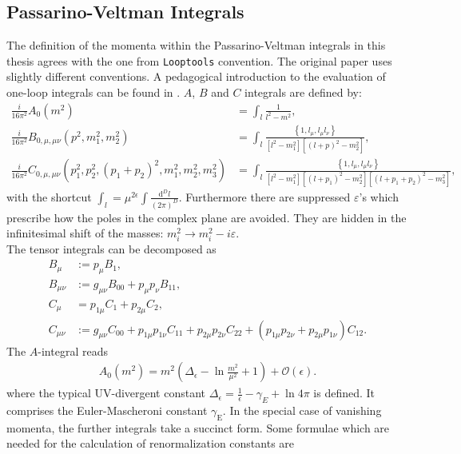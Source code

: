\subsection{Passarino-Veltman Integrals}\label{sec:Passarino}
The definition of the momenta within the Passarino-Veltman integrals in this thesis agrees with the one from \texttt{Looptools} \cite{Hahn:1998} convention. The original paper \cite{Passarino:1978jh} uses slightly different conventions. A pedagogical introduction to the evaluation of one-loop integrals can be found in \cite{Ellis:2011cr}.  $A$, $B$ and $C$ integrals are defined by:
\begin{align}
\frac{i}{16\pi^2} A_0(m^2) &= \int_l \frac{1}{l^2-m^2},\nonumber\\
\frac{i}{16\pi^2} B_{0,\mu,\mu\nu}(p^2,m_1^2,m_2^2) &= \int_l \frac{\left\{1,l_\mu,l_\mu l_\nu \right\}}{[l^2-m_1^2][(l+p)^2-m_2^2]},\\
\frac{i}{16\pi^2} C_{0,\mu,\mu\nu}(p_1^2,p_2^2,(p_1+p_2)^2,m_1^2,m_2^2,m_3^2) &= \int_l \frac{\left\{1,l_\mu,l_\mu l_\nu \right\}}{[l^2-m_1^2][(l+p_1)^2-m_2^2][(l+p_1+p_2)^2-m_3^2]},\nonumber\label{eq:LoopInt}
\end{align}
with the shortcut $\int_l = \mu^{2\epsilon}\int\frac{\mathrm{d}^D l}{(2\pi)^D}$. Furthermore there are suppressed $\varepsilon$'s which prescribe how the poles in the complex plane are avoided. They are hidden in the infinitesimal shift of the masses: $m_i^2 \to m_i^2 - i \varepsilon$.\\
The tensor integrals can be decomposed as
\begin{align}
B_\mu &:= p_\mu B_1,\nonumber\\
B_{\mu\nu} &:= g_{\mu\nu}B_{00} + p_\mu p_\nu B_{11},\nonumber\\
C_\mu &= p_{1\mu}C_1 + p_{2\mu}C_2,\\
C_{\mu\nu} &:= g_{\mu\nu}C_{00} + p_{1\mu}p_{1\nu}C_{11} + p_{2\mu}p_{2\nu}C_{22} + (p_{1\mu}p_{2\nu} + p_{2\mu}p_{1\nu})C_{12}.\nonumber
\end{align}
The $A$-integral reads
\begin{align}
A_0(m^2) = m^2\left( \Delta_\epsilon -\ln \frac{m^2}{\mu^2} + 1 \right) + \mathcal{O}(\epsilon).
\end{align}
where the typical UV-divergent constant $\Delta_\epsilon = \frac{1}{\epsilon} - \gamma_E+\ln 4\pi$ is defined. It comprises the Euler-Mascheroni constant $\gamma_{\mathrm{E}}$. In the special case of vanishing momenta, the further integrals take a succinct form. Some formulae which are needed for the calculation of renormalization constants are
